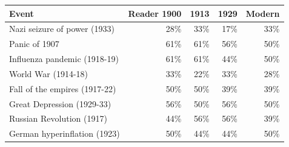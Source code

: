 \begin{tabular}{lrrrr}
\toprule
Event & Reader 1900 & 1913 & 1929 & Modern \\
\midrule
Nazi seizure of power (1933) & 28\% & 33\% & 17\% & 33\% \\
Panic of 1907 & 61\% & 61\% & 56\% & 50\% \\
Influenza pandemic (1918-19) & 61\% & 61\% & 44\% & 50\% \\
World War (1914-18) & 33\% & 22\% & 33\% & 28\% \\
Fall of the empires (1917-22) & 50\% & 50\% & 39\% & 39\% \\
Great Depression (1929-33) & 56\% & 50\% & 56\% & 50\% \\
Russian Revolution (1917) & 44\% & 56\% & 56\% & 39\% \\
German hyperinflation (1923) & 50\% & 44\% & 44\% & 50\% \\
\bottomrule
\end{tabular}
